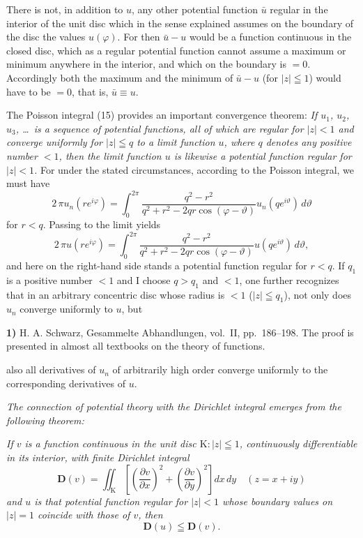 \documentclass{article}
\begin{document}
There is not, in addition to $u$, any other potential function $\bar{u}$ regular in the interior of the unit disc which in the sense explained assumes on the boundary of the disc the values $u(\varphi)$. For then $\bar{u} - u$ would be a function continuous in the closed disc, which as a regular potential function cannot assume a maximum or minimum anywhere in the interior, and which on the boundary is $= 0$. Accordingly both the maximum and the minimum of $\bar{u} - u$ (for $|z| \leqq 1$) would have to be $= 0$, that is, $\bar{u} \equiv u$.

The Poisson integral (15) provides an important convergence theorem: \emph{If $u_1$, $u_2$, $u_3$, \dots\ is a sequence of potential functions, all of which are regular for $|z| < 1$ and converge uniformly for $|z| \leqq q$ to a limit function $u$, where $q$ denotes any positive number $< 1$, then the limit function $u$ is likewise a potential function regular for $|z| < 1$.} For under the stated circumstances, according to the Poisson integral, we must have
\[ 2\,\pi u_n(r e^{i\varphi}) = \int_0^{2\pi} \frac{q^2 - r^2}{q^2 + r^2 - 2qr \cos(\varphi - \vartheta)} u_n(q e^{i\vartheta})\,d\vartheta \]
for $r < q$. Passing to the limit yields
\[ 2\,\pi u(r e^{i\varphi}) = \int_0^{2\pi} \frac{q^2 - r^2}{q^2 + r^2 - 2qr \cos(\varphi - \vartheta)} u(q e^{i\vartheta})\,d\vartheta, \]
and here on the right-hand side stands a potential function regular for $r < q$. If $q_1$ is a positive number $< 1$ and I choose $q > q_1$ and $< 1$, one further recognizes that in an arbitrary concentric disc whose radius is $< 1$ ($|z| \leqq q_1$), not only does $u_n$ converge uniformly to $u$, but

\textbf{1)} H. A. Schwarz, Gesammelte Abhandlungen, vol.~II, pp.~186--198. The proof is presented in almost all textbooks on the theory of functions.

also all derivatives of $u_n$ of arbitrarily high order converge uniformly to the corresponding derivatives of $u$.

\emph{The connection of potential theory with the Dirichlet integral emerges from the following theorem:}

\emph{If $v$ is a function continuous in the unit disc $\mathrm{K}\colon |z| \leqq 1$, continuously differentiable in its interior, with finite Dirichlet integral}
\[ \mathbf{D}(v) = \iint_{\mathrm{K}} \left[ \left(\frac{\partial v}{\partial x}\right)^2 + \left(\frac{\partial v}{\partial y}\right)^2 \right] dx\,dy \quad (z = x + iy) \]
\emph{and $u$ is that potential function regular for $|z| < 1$ whose boundary values on $|z| = 1$ coincide with those of $v$, then}
\[ \mathbf{D}(u) \leqq \mathbf{D}(v). \tag{16} \]
\end{document}
